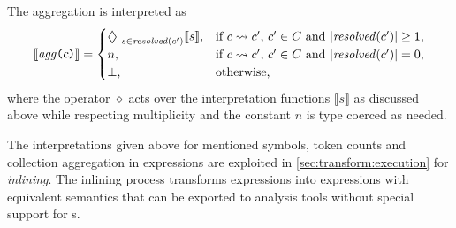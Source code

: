 The aggregation  is interpreted as
\begin{equation}
  \llbracket \rel{agg} \lit( c \lit) \rrbracket = \begin{cases}
    \bigDiamond_{s \in \rel{resolved}(c')} \llbracket s \rrbracket \text, & \text{if \(c \leadsto c'\), \(c' \in C\) and \(\lvert \rel{resolved}(c') \rvert \ge 1\),} \\
    n \text, & \text{if \(c \leadsto c'\), \(c' \in C\) and \(\lvert \rel{resolved}(c') \rvert = 0\),} \\
    {\perp} \text, & \text{otherwise,}
  \end{cases}
\end{equation}
where the operator \(\diamond\) acts over the interpretation functions \(\llbracket s \rrbracket\) as discussed above while respecting multiplicity and the constant \(n\) is type coerced as needed.

The interpretations given above for mentioned symbols, token counts and collection aggregation in expressions are exploited in \vref{sec:transform:execution} for \emph{inlining}. The inlining process transforms expressions into expressions with equivalent semantics that can be exported to analysis tools without special support for s.

